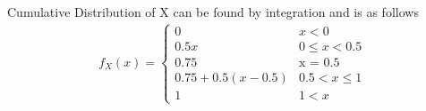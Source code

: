 \documentclass[../../probability-notes.tex]{subfiles}
\begin{document}
Cumulative Distribution of X can be found by integration and is as follows
        \begin{align*}
            f_{X}(x) = \begin{cases} 0 &\mbox{$x < 0$}\\
                                     0.5x &\mbox{$0 \leq x < 0.5$}\\
                                     0.75 &\mbox{x = 0.5}\\
                                     0.75 + 0.5(x-0.5) &\mbox{$0.5 < x \leq 1$} \\
                                     1 &\mbox {$1 < x$}\end{cases}
        \end{align*}
\end{document}
